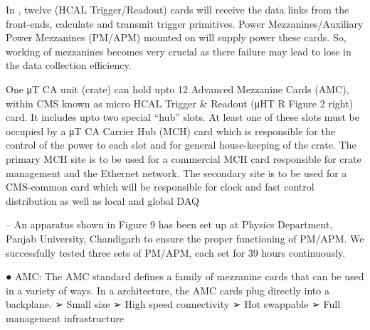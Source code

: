 In \mtca, twelve \mhtr (HCAL Trigger/Readout) cards will receive the data links from the front-ends, calculate and transmit trigger primitives. Power Mezzanines/Auxiliary Power Mezzanines (PM/APM) mounted on \mhtr will supply power these cards. So, working of mezzanines becomes very crucial as there failure may lead to lose in the data collection efficiency.


One μT CA unit (crate) can hold upto 12 Advanced Mezzanine Cards (AMC), within CMS known
as micro HCAL Trigger \& Readout (μHT R Figure 2 right) card. It includes upto two special “hub”
slots. At least one of these slots must be occupied by a μT CA Carrier Hub (MCH) card which is
responsible for the control of the power to each slot and for general house-keeping of the crate. The
primary MCH site is to be used for a commercial MCH card responsible for crate management and the
Ethernet network. The secondary site is to be used for a CMS-common card which will be responsible
for clock and fast control distribution as well as local and global DAQ


– An apparatus shown in Figure 9 has been set up at Physics Department, Panjab University, Chandigarh to ensure the proper functioning of PM/APM. We successfully tested three sets of PM/APM, each set for 39 hours continuously.

● AMC:
The AMC standard defines a family of mezzanine cards that can be
used in a variety of ways. In a \mtca architecture, the AMC cards plug
directly into a backplane.
➢ Small size
➢ High speed connectivity
➢ Hot swappable
➢ Full management infrastructure



